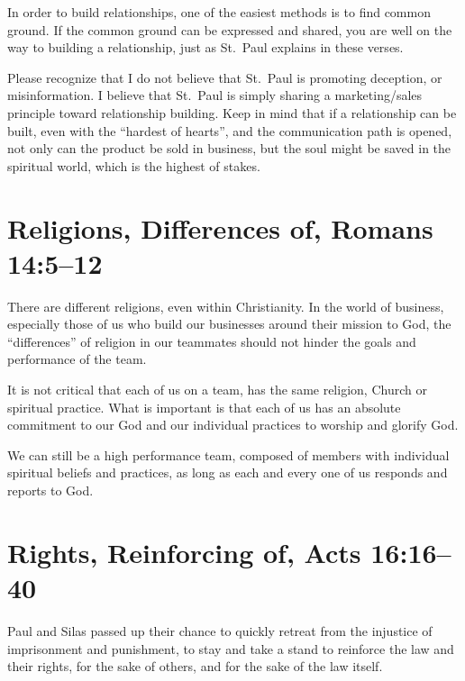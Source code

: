 \documentclass[12pt]{memoir}
\begin{document}
In order to build relationships, one of the easiest methods is to
find common ground.
If the common ground can be expressed and shared,
you are well on the way to building a relationship, just as St.~Paul
explains in these verses.

Please recognize that I do not believe that St.~Paul is promoting
deception, or misinformation. I believe that St.~Paul is simply sharing
a marketing\slash{}sales principle toward relationship building. Keep in
mind that if a relationship can be built, even with the ``hardest
of hearts'', and the communication path is opened, not only can the
product be sold in business, but the soul might be saved in the spiritual
world, which is the highest of stakes.

\section[Religions, Differences of]{Religions, Differences of, Romans 14:5--12}

There are different religions, even within Christianity. In the world
of business, especially those of us who build our businesses around
their mission to God, the ``differences'' of religion in our teammates
should not hinder the goals and performance of the team.

It is not critical that each of us on a team, has the same religion,
Church or spiritual practice. What is important is that each of us
has an absolute commitment to our God and our individual practices
to worship and glorify God.

We can still be a high performance team, composed of members with individual spiritual beliefs and practices, as long as each and every one of us responds and reports to God.


\section[Rights, Reinforcing of]{Rights, Reinforcing of, Acts 16:16--40}

Paul and Silas passed up their chance to quickly retreat from the
injustice of imprisonment and punishment, to stay and take a stand to reinforce the law and their rights, for the sake of others, and for the sake of the law itself.
\end{document}
